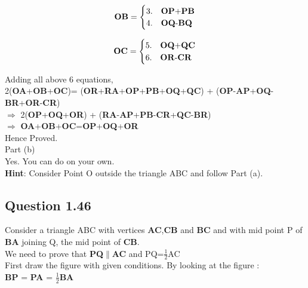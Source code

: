 \documentclass{article}
\begin{document}
\[
    \textbf{OB} =
    \begin{cases}
    		3. & \text{\textbf{OP}+\textbf{PB}}\\
    		4. & \text{\textbf{OQ}-\textbf{BQ}}
    \end{cases}
\]

\[
    \textbf{OC} =
    \begin{cases}
    		5. & \text{\textbf{OQ}+\textbf{QC}}\\
    		6. & \text{\textbf{OR}-\textbf{CR}}
    \end{cases}
\]

	Adding all above 6 equations, \\
	
	2(\textbf{OA}+\textbf{OB}+\textbf{OC})= (\textbf{OR}+\textbf{RA}+\textbf{OP}+\textbf{PB}+\textbf{OQ}+\textbf{QC}) + (\textbf{OP}-\textbf{AP}+\textbf{OQ}-\textbf{BR}+\textbf{OR}-\textbf{CR})\\
	
$\Rightarrow$ 	2(\textbf{OP}+\textbf{OQ}+\textbf{OR}) + (\textbf{RA}-\textbf{AP}+\textbf{PB}-\textbf{CR}+\textbf{QC}-\textbf{BR})\\

$\Rightarrow$	\textbf{OA}+\textbf{OB}+\textbf{OC}=\textbf{OP}+\textbf{OQ}+\textbf{OR}\\

	Hence Proved.\\
	
	Part (b) \\
	
	Yes. You can do on your own.\\
	\textbf{Hint}: Consider Point O outside the triangle ABC and follow Part (a).
	
	
	\subsection{Question 1.46}
	
	Consider a triangle ABC with vertices \textbf{AC},\textbf{CB} and \textbf{BC} and with mid point P of \textbf{BA} joining Q, the mid point of \textbf{CB}.\\
	
	We need to prove that \textbf{PQ}$\parallel$\textbf{AC} and PQ=$\frac{1}{2}$AC\\
	
	First draw the figure with given conditions. By looking at the figure : \\
	
	\textbf{BP} = \textbf{PA} = $\frac{1}{2}$\textbf{BA}\\
	
\end{document}
